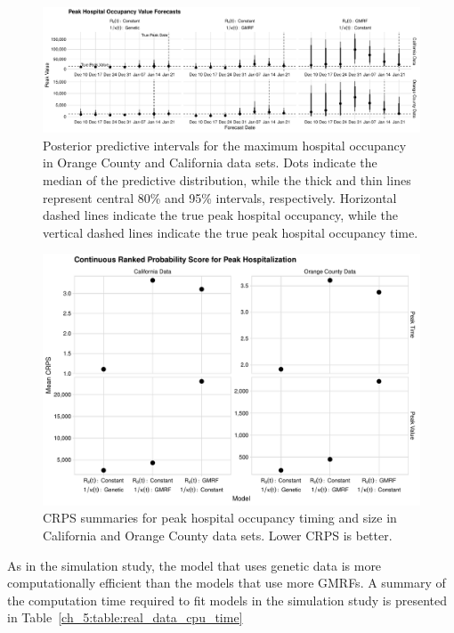 \begin{figure}
    \centering
    \includegraphics[width=1.0\columnwidth]{real_data_peak_assessment_value_plot}
    \caption[Posterior predictive intervals for peak hospital occupancy for real data sets.]{Posterior predictive intervals for the maximum hospital occupancy in Orange County and California  data sets.
    Dots indicate the median of the predictive distribution, while the thick and thin lines represent central 80\% and 95\% intervals, respectively.
    Horizontal dashed lines indicate the true peak hospital occupancy, while the vertical dashed lines indicate the true peak hospital occupancy time.}
    \label{ch_5:fig:real_data_peak_assessment_value_plot}
\end{figure}

\begin{figure}
    \centering
    \includegraphics[width=1.0\columnwidth]{real_data_peak_crps_dotplot_plot}
    \caption[CRPS summaries for peak hospital occupancy in real data sets.]{CRPS summaries for peak hospital occupancy timing and size in California and Orange County data sets. Lower CRPS is better.}
    \label{ch_5:fig:real_data_peak_crps_dotplot_plot}
\end{figure}

As in the simulation study, the model that uses genetic data is more computationally efficient than the models that use more GMRFs.
A summary of the computation time required to fit models in the simulation study is presented in Table~\ref{ch_5:table:real_data_cpu_time}

